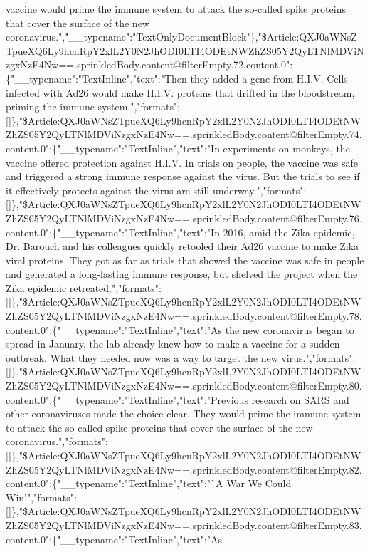 vaccine would prime the immune system to attack the so-called spike
proteins that cover the surface of the new
coronavirus.","\_\_typename":"TextOnlyDocumentBlock"\},"\$Article:QXJ0aWNsZTpueXQ6Ly9hcnRpY2xlL2Y0N2JhODI0LTI4ODEtNWZhZS05Y2QyLTNlMDViNzgxNzE4Nw==.sprinkledBody.content@filterEmpty.72.content.0":\{"\_\_typename":"TextInline","text":"Then
they added a gene from H.I.V. Cells infected with Ad26 would make H.I.V.
proteins that drifted in the bloodstream, priming the immune
system.","formats":{[}{]}\},"\$Article:QXJ0aWNsZTpueXQ6Ly9hcnRpY2xlL2Y0N2JhODI0LTI4ODEtNWZhZS05Y2QyLTNlMDViNzgxNzE4Nw==.sprinkledBody.content@filterEmpty.74.content.0":\{"\_\_typename":"TextInline","text":"In
experiments on monkeys, the vaccine offered protection against H.I.V. In
trials on people, the vaccine was safe and triggered a strong immune
response against the virus. But the trials to see if it effectively
protects against the virus are still
underway.","formats":{[}{]}\},"\$Article:QXJ0aWNsZTpueXQ6Ly9hcnRpY2xlL2Y0N2JhODI0LTI4ODEtNWZhZS05Y2QyLTNlMDViNzgxNzE4Nw==.sprinkledBody.content@filterEmpty.76.content.0":\{"\_\_typename":"TextInline","text":"In
2016, amid the Zika epidemic, Dr. Barouch and his colleagues quickly
retooled their Ad26 vaccine to make Zika viral proteins. They got as far
as trials that showed the vaccine was safe in people and generated a
long-lasting immune response, but shelved the project when the Zika
epidemic
retreated.","formats":{[}{]}\},"\$Article:QXJ0aWNsZTpueXQ6Ly9hcnRpY2xlL2Y0N2JhODI0LTI4ODEtNWZhZS05Y2QyLTNlMDViNzgxNzE4Nw==.sprinkledBody.content@filterEmpty.78.content.0":\{"\_\_typename":"TextInline","text":"As
the new coronavirus began to spread in January, the lab already knew how
to make a vaccine for a sudden outbreak. What they needed now was a way
to target the new
virus.","formats":{[}{]}\},"\$Article:QXJ0aWNsZTpueXQ6Ly9hcnRpY2xlL2Y0N2JhODI0LTI4ODEtNWZhZS05Y2QyLTNlMDViNzgxNzE4Nw==.sprinkledBody.content@filterEmpty.80.content.0":\{"\_\_typename":"TextInline","text":"Previous
research on SARS and other coronaviruses made the choice clear. They
would prime the immune system to attack the so-called spike proteins
that cover the surface of the new
coronavirus.","formats":{[}{]}\},"\$Article:QXJ0aWNsZTpueXQ6Ly9hcnRpY2xlL2Y0N2JhODI0LTI4ODEtNWZhZS05Y2QyLTNlMDViNzgxNzE4Nw==.sprinkledBody.content@filterEmpty.82.content.0":\{"\_\_typename":"TextInline","text":"`A
War We Could
Win'","formats":{[}{]}\},"\$Article:QXJ0aWNsZTpueXQ6Ly9hcnRpY2xlL2Y0N2JhODI0LTI4ODEtNWZhZS05Y2QyLTNlMDViNzgxNzE4Nw==.sprinkledBody.content@filterEmpty.83.content.0":\{"\_\_typename":"TextInline","text":"As
